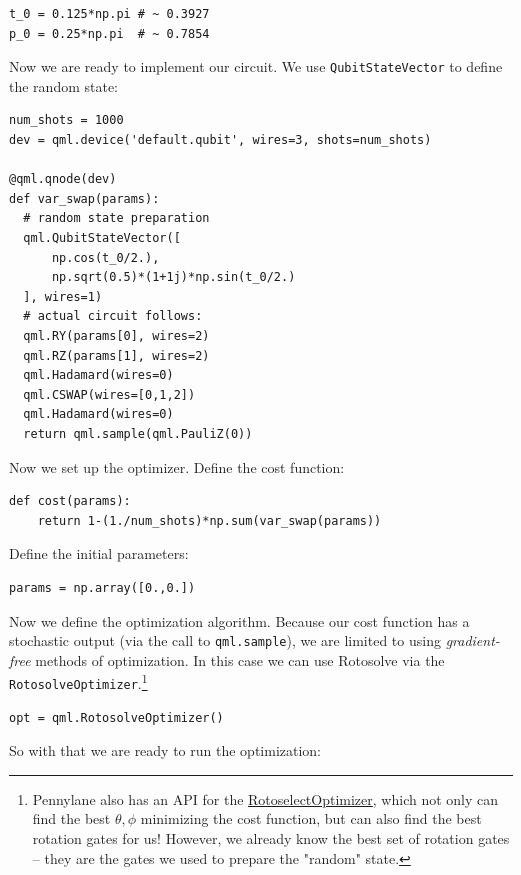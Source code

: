 \documentclass[11pt]{article}
\begin{document}
\begin{verbatim}
t_0 = 0.125*np.pi # ~ 0.3927
p_0 = 0.25*np.pi  # ~ 0.7854
\end{verbatim}

Now we are ready to implement our circuit. We use \texttt{QubitStateVector} to define the random state: 

\begin{verbatim}
num_shots = 1000
dev = qml.device('default.qubit', wires=3, shots=num_shots)

@qml.qnode(dev)
def var_swap(params):
  # random state preparation
  qml.QubitStateVector([
      np.cos(t_0/2.),
      np.sqrt(0.5)*(1+1j)*np.sin(t_0/2.)
  ], wires=1)
  # actual circuit follows:
  qml.RY(params[0], wires=2)
  qml.RZ(params[1], wires=2)
  qml.Hadamard(wires=0)
  qml.CSWAP(wires=[0,1,2])
  qml.Hadamard(wires=0)
  return qml.sample(qml.PauliZ(0))
\end{verbatim}


Now we set up the optimizer.
Define the cost function:

\begin{verbatim}
def cost(params):
    return 1-(1./num_shots)*np.sum(var_swap(params))
\end{verbatim}

Define the initial parameters:

\begin{verbatim}
params = np.array([0.,0.])
\end{verbatim}

Now we define the optimization algorithm.
Because our cost function has a stochastic output (via the call to \texttt{qml.sample}), we are limited to using \emph{gradient-free} methods of optimization.
In this case we can use Rotosolve via the \texttt{RotosolveOptimizer}.\footnote{Pennylane also has an API for the \href{https://pennylane.readthedocs.io/en/stable/code/api/pennylane.RotoselectOptimizer.html}{RotoselectOptimizer}, which not only can find the best \(\theta, \phi\) minimizing the cost function, but can also find the best rotation gates for us! However, we already know the best set of rotation gates -- they are the gates we used to prepare the "random" state.}

\begin{verbatim}
opt = qml.RotosolveOptimizer()

\end{verbatim}

So with that we are ready to run the optimization:
\end{document}
